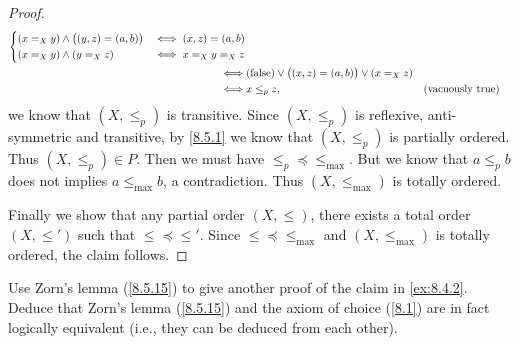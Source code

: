 \begin{proof}
\begin{align*}
\begin{dcases}
             (x =_X y) \land \big((y, z) = (a, b)\big)                 & \iff (x, z) = (a, b) \\
             (x =_X y) \land (y =_X z)                                 & \iff x =_X y =_X z
           \end{dcases}                                 \\
    \iff & (\text{false}) \lor \big((x, z) = (a, b)\big) \lor (x =_X z)                                                     \\
    \iff & x \leq_p z,                                                                         &  & \text{(vacuously true)}
  \end{align*}
  we know that \((X, \leq_p)\) is transitive.
  Since \((X, \leq_p)\) is reflexive, anti-symmetric and transitive, by \cref{8.5.1} we know that \((X, \leq_p)\) is partially ordered.
  Thus \((X, \leq_p) \in P\).
  Then we must have \(\leq_p \preceq \leq_{\max}\).
  But we know that \(a \leq_p b\) does not implies \(a \leq_{\max} b\), a contradiction.
  Thus \((X, \leq_{\max})\) is totally ordered.

  Finally we show that any partial order \((X, \leq)\), there exists a total order \((X, \leq')\) such that \(\leq \preceq \leq'\).
  Since \(\leq \preceq \leq_{\max}\) and \((X, \leq_{\max})\) is totally ordered, the claim follows.
\end{proof}

\begin{ex}\label{ex:8.5.17}
  Use Zorn's lemma (\cref{8.5.15}) to give another proof of the claim in \cref{ex:8.4.2}.
  Deduce that Zorn's lemma (\cref{8.5.15}) and the axiom of choice (\cref{8.1}) are in fact logically equivalent
  (i.e., they can be deduced from each other).
\end{ex}

